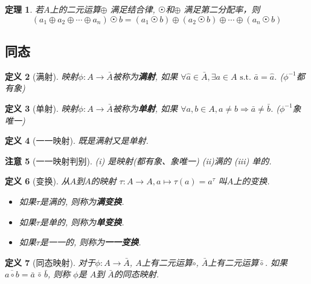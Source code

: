 \documentclass[UTF8]{ctexart}
\newtheorem{Definition}{定义}%
\newtheorem{Theorem}[Definition]{定理}
\newtheorem{Remark}[Definition]{注意}
\begin{document}
\begin{Theorem}
若$A$上的二元运算$\oplus$ 满足结合律, $ \astrosun $和$\oplus $ 满足第二分配率，则
$$
( a_1 \oplus a_2 \oplus \cdots \oplus a_n ) \, \astrosun \, b =  ( a_1 \, \astrosun \, b) \oplus ( a_2 \, \astrosun \, b) \oplus \cdots \oplus (  a_n \, \astrosun \, b)
$$
\end{Theorem}

\subsection{同态}

\begin{Definition}[满射]
映射$\phi: A \rightarrow \bar{A}$被称为\textbf{满射}, 如果
$\forall \hat{a} \in \bar{A}, \exists a \in A \text{ s.t. } \bar{a} = \hat{a}$. 
($\phi^{-1}$都有象)
\end{Definition}

\begin{Definition}[单射]
映射$\phi: A \rightarrow \bar{A}$被称为\textbf{单射}, 如果
$\forall a, b \in A, a \neq b \Rightarrow \bar{a} \neq \bar{b}$.
 ($\phi^{-1}$象唯一)
\end{Definition}

\begin{Definition}[一一映射]
既是满射又是单射.
\end{Definition}

\begin{Remark}[一一映射判别]
(i) 是映射(都有象、象唯一) (ii)满的 (iii) 单的.
\end{Remark}

\begin{Definition}[变换]
从$A$到$A$的映射 $\tau: A \rightarrow A, a \mapsto \tau(a) = a^{\tau}$ 叫$A$上的变换.
\begin{itemize}
	\item 如果$\tau$是满的, 则称为\textbf{满变换}.
	\item 如果$\tau$是单的, 则称为\textbf{单变换}.
	\item 如果$\tau$是一一的, 则称为\textbf{一一变换}.
\end{itemize}
\end{Definition}

\begin{Definition}[同态映射]
对于$\phi: A \rightarrow \bar{A}$, $A$上有二元运算$\circ$, $\bar{A}$上有二元运算$\bar{\circ}$.
如果
$ \overline{a \circ b} = \bar{a} \, \bar{\circ} \, \bar{b}$, 则称 $\phi$是 $A$到 $\bar{A}$的同态映射.
\end{Definition}
\end{document}
